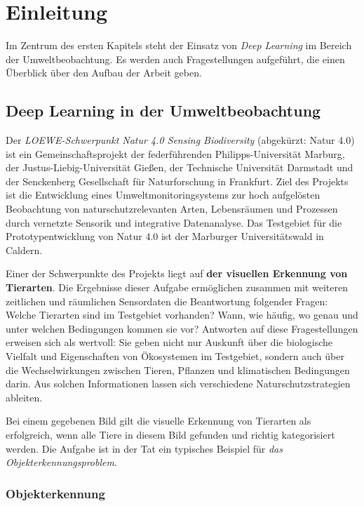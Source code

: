\chapter{Einleitung} \label{chap:intro}

Im Zentrum des ersten Kapitels steht der Einsatz von \emph{Deep Learning} im Bereich der Umweltbeobachtung. Es werden auch Fragestellungen aufgeführt, die einen Überblick über den Aufbau der Arbeit geben.

\section{Deep Learning in der Umweltbeobachtung}

Der \emph{LOEWE-Schwerpunkt Natur 4.0 Sensing Biodiversity} (abgekürzt: Natur 4.0) ist ein Gemeinschaftsprojekt der federführenden Philipps-Universität Marburg, der Justus-Liebig-Universität Gießen, der Technische Universität Darmstadt und der Senckenberg Gesellschaft für Naturforschung in Frankfurt. Ziel des Projekts ist die Entwicklung eines Umweltmonitoringsystems zur hoch aufgelösten Beobachtung von naturschutzrelevanten Arten, Lebensräumen und Prozessen durch vernetzte Sensorik und integrative Datenanalyse. Das Testgebiet für die Prototypentwicklung von Natur 4.0 ist der Marburger Universitätswald in Caldern. 

Einer der Schwerpunkte des Projekts liegt auf \textbf{der visuellen Erkennung von Tierarten}. Die Ergebnisse dieser Aufgabe ermöglichen zusammen mit weiteren zeitlichen und räumlichen Sensordaten die Beantwortung folgender Fragen: Welche Tierarten sind im Testgebiet vorhanden? Wann, wie häufig, wo genau und unter welchen Bedingungen kommen sie vor? Antworten auf diese Fragestellungen erweisen sich als wertvoll: Sie geben nicht nur Auskunft über die biologische Vielfalt und Eigenschaften von Ökosystemen im Testgebiet, sondern auch über die Wechselwirkungen zwischen Tieren, Pflanzen und klimatischen Bedingungen darin. Aus solchen Informationen lassen sich verschiedene Naturschutzstrategien ableiten.

Bei einem gegebenen Bild gilt die visuelle Erkennung von Tierarten als erfolgreich, wenn alle Tiere in diesem Bild gefunden und richtig kategorisiert werden. Die Aufgabe ist in der Tat ein typisches Beispiel für \emph{das Objekterkennungsproblem}.

\subsection{Objekterkennung}

